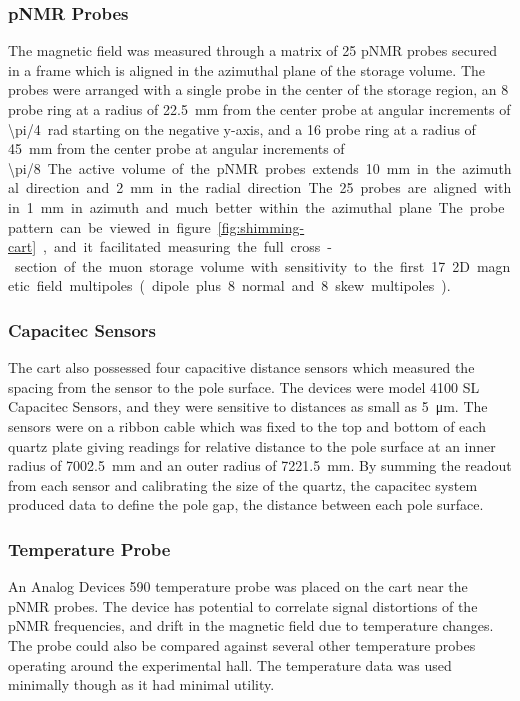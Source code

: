 \subsubsection{pNMR Probes}
The magnetic field was measured through a matrix of 25 pNMR probes secured in a frame which is aligned in the azimuthal plane of the storage volume.  The probes were arranged with a single probe in the center of the storage region, an 8 probe ring at a radius of \SI{22.5}{\mm} from the center probe at angular increments of \SI{\pi/4}{\radian} starting on the negative y-axis, and a 16 probe ring at a radius of \SI{45}{\mm} from the center probe at angular increments of \SI{\pi/8}.  The active volume of the pNMR probes extends \SI{10}{\mm} in the azimuthal direction and \SI{2}{\mm} in the radial direction.  The 25 probes are aligned within \SI{1}{\mm} in azimuth and much better within the azimuthal plane.  The probe pattern can be viewed in figure \ref{fig:shimming-cart}, and it facilitated measuring the full cross-section of the muon storage volume with sensitivity to the first 17 2D magnetic field multipoles (dipole plus 8 normal and 8 skew multipoles).

\subsubsection{Capacitec Sensors}
The cart also possessed four capacitive distance sensors which measured the spacing from the sensor to the pole surface.  The devices were model 4100 SL Capacitec Sensors, and they were sensitive to distances as small as \SI{5}{\micro \meter}.   The sensors were on a ribbon cable which was fixed to the top and bottom of each quartz plate giving readings for relative distance to the pole surface at an inner radius of \SI{7002.5}{\mm} and an outer radius of \SI{7221.5}{\mm}.  By summing the readout from each sensor and calibrating the size of the quartz, the capacitec system produced data to define the pole gap, the distance between each pole surface.

\subsubsection{Temperature Probe}
An Analog Devices 590 temperature probe was placed on the cart near the pNMR probes. The device has potential to correlate signal distortions of the pNMR frequencies, and drift in the magnetic field due to temperature changes.  The probe could also be compared against several other temperature probes operating around the experimental hall.  The temperature data was used minimally though as it had minimal utility.

